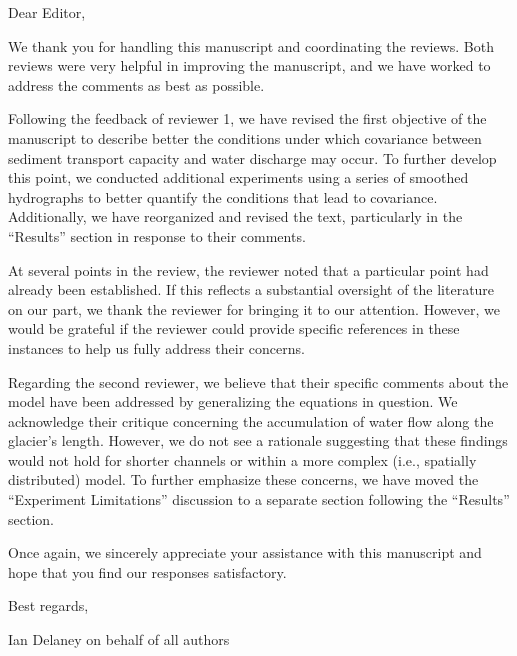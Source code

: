 \documentclass[11pt]{article}
\title{}
\author{}
\begin{document}
Dear Editor,

\vspace{.2cm}

We thank you for handling this manuscript and coordinating the reviews. Both reviews were very helpful in improving the manuscript, and we have worked to address the comments as best as possible.

\vspace{.2cm}

Following the feedback of reviewer 1, we have revised the first objective of the manuscript to describe better the conditions under which covariance between sediment transport capacity and water discharge may occur. To further develop this point, we conducted additional experiments using a series of smoothed hydrographs to better quantify the conditions that lead to covariance. Additionally, we have reorganized and revised the text, particularly in the ``Results'' section in response to their comments. 

\vspace{.2cm}

At several points in the review, the reviewer noted that a particular point had already been established. If this reflects a substantial oversight of the literature on our part, we thank the reviewer for bringing it to our attention. However, we would be grateful if the reviewer could provide specific references in these instances to help us fully address their concerns.

\vspace{.2cm}

Regarding the second reviewer, we believe that their specific comments about the model have been addressed by generalizing the equations in question. We acknowledge their critique concerning the accumulation of water flow along the glacier’s length. However, we do not see a rationale suggesting that these findings would not hold for shorter channels or within a more complex (i.e., spatially distributed) model. To further emphasize these concerns, we have moved the ``Experiment Limitations'' discussion to a separate section following the ``Results'' section.

\vspace{.2cm}

Once again, we sincerely appreciate your assistance with this manuscript and hope that you find our responses satisfactory.

\vspace{.5cm}

Best regards,

\vspace{.75cm}

Ian Delaney on behalf of all authors
\end{document}
